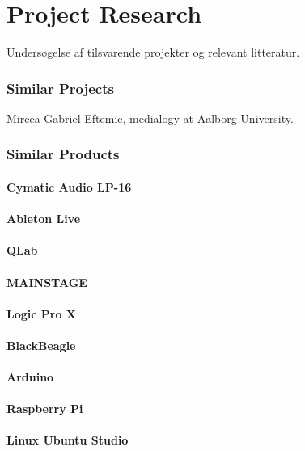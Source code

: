 \chapter{Project Research}
Undersøgelse af tilsvarende projekter og relevant litteratur.

\subsection{Similar Projects}
Mircea Gabriel Eftemie, medialogy at Aalborg University.

\subsection{Similar Products}


\subsubsection{Cymatic Audio LP-16}


\subsubsection{Ableton Live}


\subsubsection{QLab}


\subsubsection{MAINSTAGE}


\subsubsection{Logic Pro X}


\subsubsection{BlackBeagle}


\subsubsection{Arduino}


\subsubsection{Raspberry Pi}


\subsubsection{Linux Ubuntu Studio}

